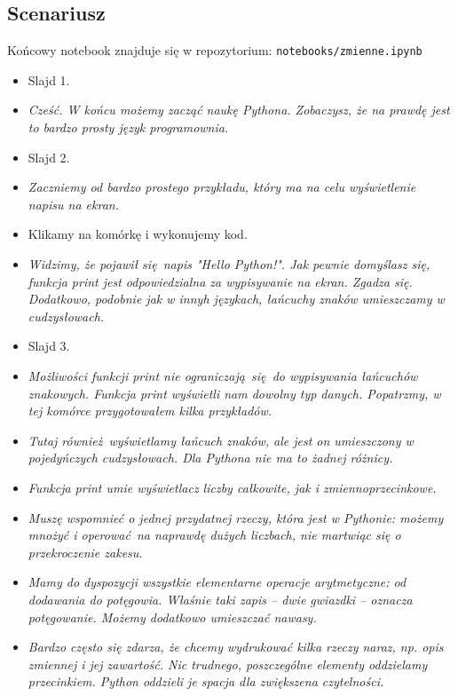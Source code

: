 \documentclass{mwart}
\begin{document}
\subsection{Scenariusz}
Końcowy notebook znajduje się w repozytorium: \texttt{notebooks/zmienne.ipynb}
\begin{itemize}
  \item Slajd 1.
  \item \emph{Cześć. W końcu możemy zacząć naukę Pythona. Zobaczysz, że na prawdę jest
      to bardzo prosty język programownia.}
  \item Slajd 2.
  \item \emph{Zaczniemy od bardzo prostego przykładu, który ma na celu wyświetlenie
      napisu na ekran.}
  \item Klikamy na komórkę i wykonujemy kod.
  \item \emph{Widzimy, że pojawił się napis "Hello Python!". Jak pewnie domyślasz się,
      funkcja print jest odpowiedzialna za wypisywanie na ekran. Zgadza się. Dodatkowo,
      podobnie jak w innyh językach, łańcuchy znaków umieszczamy w cudzysłowach.}
  \item Slajd 3.
  \item \emph{Możliwości funkcji print nie ograniczają się do wypisywania łańcuchów
      znakowych. Funkcja print wyświetli nam dowolny typ danych. Popatrzmy, w tej
      komórce przygotowałem kilka przykładów. }
  \item \emph{Tutaj również wyświetlamy łańcuch znaków, ale jest on umieszczony w
      pojedyńczych cudzysłowach. Dla Pythona nie ma to żadnej różnicy.}
  \item \emph{Funkcja print umie wyświetlacz liczby całkowite, jak i zmiennoprzecinkowe.}
  \item \emph{Muszę wspomnieć o jednej przydatnej rzeczy, która jest w Pythonie: możemy
      mnożyć i operować na naprawdę dużych liczbach, nie martwiąc się o przekroczenie
      zakesu.}
  \item \emph{Mamy do dyspozycji wszystkie elementarne operacje arytmetyczne: od
      dodawania do potęgowia. Właśnie taki zapis -- dwie gwiazdki -- oznacza
      potęgowanie. Możemy dodatkowo umieszczać nawasy.}
  \item \emph{Bardzo często się zdarza, że chcemy wydrukować kilka rzeczy naraz, np.
      opis zmiennej i jej zawartość. Nic trudnego, poszczególne elementy oddzielamy
      przecinkiem. Python oddzieli je spacja dla zwiększena czytelności.}


\end{itemize}
\end{document}
